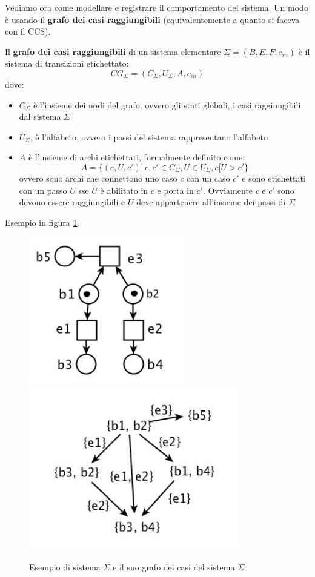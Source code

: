 \documentclass[a4paper,12pt, oneside]{book}
\begin{document}
Vediamo ora come modellare e registrare il comportamento del sistema. Un modo è
usando il \textbf{grafo dei casi raggiungibili} (equivalentemente a quanto si
faceva con il CCS).
\newpage
\begin{definizione}
  Il \textbf{grafo dei casi raggiungibili} di un sistema elementare
  $\Sigma=(B,E,F;c_{in})$ è il sistema di transizioni etichettato:
  \[CG_\Sigma=(C_\Sigma, U_\Sigma, A, c_{in})\]
  dove:
  \begin{itemize}
    \item $C_\Sigma$ è l'insieme dei nodi del grafo, ovvero gli stati globali,
    i casi raggiungibili dal sistema $\Sigma$    
    \item $U_\Sigma$, è l'alfabeto, ovvero i passi del sistema rappresentano
    l'alfabeto 
    \item $A$ è l'insieme di archi etichettati, formalmente definito come:
    \[A=\{(c,U,c')|\,c,c'\in C_\Sigma, U\in U_\Sigma, c[U>c'\}\]
    ovvero sono archi che connettono uno caso $c$ con un caso $c'$ e sono
    etichettati con un passo $U$ sse $U$ è abilitato in $c$ e porta in
    $c'$. Ovviamente $c$ e $c'$ sono devono essere raggiungibili e $U$ deve
    appartenere all'insieme dei passi di $\Sigma$
  \end{itemize}
  Esempio in figura \ref{fig:gra}.
\end{definizione}
\begin{figure}
  \centering
  \includegraphics[scale = 0.5]{img/seq1.jpg}
  \includegraphics[scale = 0.5]{img/seq2.jpg}
  \caption{Esempio di sistema $\Sigma$ e il suo grafo dei casi del sistema
    $\Sigma$}
  \label{fig:gra}
\end{figure}
\end{document}
